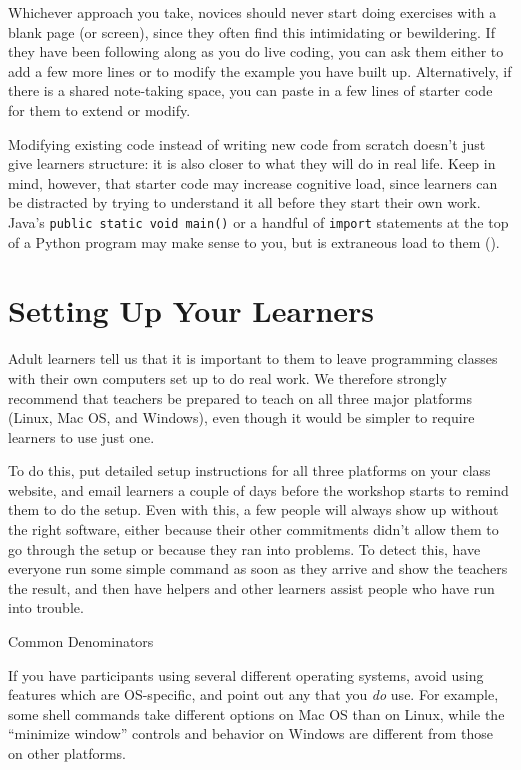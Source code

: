Whichever approach you take, novices should never start doing
exercises with a blank page (or screen), since they often find this
intimidating or bewildering.  If they have been following along as you
do live coding, you can ask them either to add a few more lines or to
modify the example you have built up.  Alternatively, if there is a
shared note-taking space, you can paste in a few lines of starter code
for them to extend or modify.

Modifying existing code instead of writing new code from scratch
doesn't just give learners structure: it is also closer to what they
will do in real life.  Keep in mind, however, that starter code may
increase cognitive load, since learners can be distracted by trying to
understand it all before they start their own work.  Java's
\texttt{public static void main()} or a handful of \texttt{import}
statements at the top of a Python program may make sense to you, but
is extraneous load to them ().

\section{Setting Up Your Learners}\label{s:classroom-setup}

Adult learners tell us that it is important to them to leave
programming classes with their own computers set up to do real
work. We therefore strongly recommend that teachers be prepared to
teach on all three major platforms (Linux, Mac OS, and Windows), even
though it would be simpler to require learners to use just one.

To do this, put detailed setup instructions for all three platforms on
your class website, and email learners a couple of days before the
workshop starts to remind them to do the setup. Even with this, a few
people will always show up without the right software, either because
their other commitments didn't allow them to go through the setup or
because they ran into problems. To detect this, have everyone run some
simple command as soon as they arrive and show the teachers the
result, and then have helpers and other learners assist people who
have run into trouble.

\begin{callout}{Common Denominators}

  If you have participants using several different operating systems,
  avoid using features which are OS-specific, and point out any that
  you \emph{do} use. For example, some shell commands take different
  options on Mac OS than on Linux, while the ``minimize window''
  controls and behavior on Windows are different from those on other
  platforms.

\end{callout}

